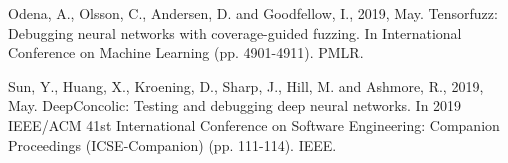\documentclass[10pt, conference, a4paper, final]{IEEEtran}
\begin{document}
\begin{thebibliography}{01}
     Odena, A., Olsson, C., Andersen, D. and Goodfellow, I., 2019, May. Tensorfuzz: Debugging neural networks with coverage-guided fuzzing. In International Conference on Machine Learning (pp. 4901-4911). PMLR.

    Sun, Y., Huang, X., Kroening, D., Sharp, J., Hill, M. and Ashmore, R., 2019, May. DeepConcolic: Testing and debugging deep neural networks. In 2019 IEEE/ACM 41st International Conference on Software Engineering: Companion Proceedings (ICSE-Companion) (pp. 111-114). IEEE.

\end{thebibliography}
\end{document}
